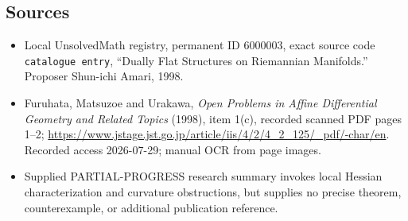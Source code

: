 \documentclass[11pt]{article}
\begin{document}
\subsection{Sources}
\begin{itemize}
\item Local UnsolvedMath registry, permanent ID \(6000003\), exact source code \texttt{catalogue entry}, ``Dually Flat Structures on Riemannian Manifolds.'' Proposer Shun-ichi Amari, 1998.
\item Furuhata, Matsuzoe and Urakawa, \emph{Open Problems in Affine Differential Geometry and Related Topics} (1998), item 1(c), recorded scanned PDF pages 1--2; \url{https://www.jstage.jst.go.jp/article/iis/4/2/4_2_125/_pdf/-char/en}. Recorded access 2026-07-29; manual OCR from page images.
\item Supplied PARTIAL-PROGRESS research summary invokes local Hessian characterization and curvature obstructions, but supplies no precise theorem, counterexample, or additional publication reference.
\end{itemize}
\end{document}
